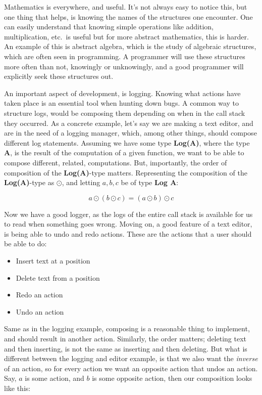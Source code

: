Mathematics is everywhere, and useful. It's not always easy to notice this, but
one thing that helps, is knowing the names of the structures one encounter. One
can easily understand that knowing simple operations like addition,
multiplication, etc.\ is useful but for more abstract mathematics, this is
harder. An example of this is abstract algebra, which is the study of algebraic
structures, which are often seen in programming. A programmer will use these
structures more often than not, knowingly or unknowingly, and a good programmer
will explicitly seek these structures out.

An important aspect of development, is logging. Knowing what actions have taken
place is an essential tool when hunting down bugs. A common way to structure
logs, would be composing them depending on when in the call stack they occurred.
As a concrete example, let's say we are making a text editor, and are in the
need of a logging manager, which, among other things, should compose different
log statements. Assuming we have some type \textbf{Log(A)}, where the type
\textbf{A}, is the result of the computation of a given function, we want to be
able to compose different, related, computations. But, importantly, the order of
composition of the \textbf{Log(A)}-type matters. Representing the composition of
the \textbf{Log(A)}-type as $\odot$, and letting $a, b, c$ be of type
\textbf{Log A}:

\begin{definition} \label{def:logComp}
  \begin{equation}
    a \odot \left ( b \odot c \right ) = \left ( a \odot b \right ) \odot c
  \end{equation}
\end{definition}

Now we have a good logger, as the logs of the entire call stack is available for
us to read when something goes wrong. Moving on, a good feature of a text
editor, is being able to undo and redo actions. These are the actions that a
user should be able to do:

\begin{itemize}
  \item Insert text at a position
  \item Delete text from a position
  \item Redo an action
  \item Undo an action
\end{itemize}

Same as in the logging example, composing is a reasonable thing to implement,
and should result in another action. Similarly, the order matters; deleting text
and then inserting, is not the same as inserting and then deleting. But what is
different between the logging and editor example, is that we also want the
\textit{inverse} of an action, so for every action we want an opposite action
that undos an action. Say, $a$ is some action, and $b$ is some opposite action,
then our composition looks like this:


